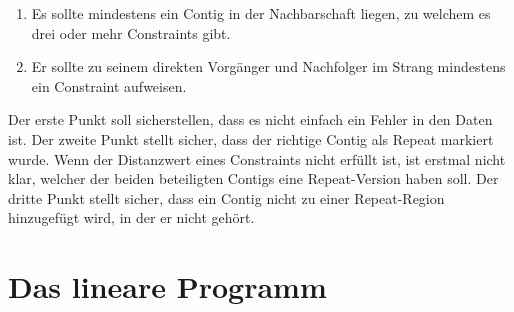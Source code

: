 \begin{enumerate}
	\item Es sollte mindestens ein Contig in der Nachbarschaft liegen, zu welchem es drei oder mehr Constraints gibt.
	\item Er sollte zu seinem direkten Vorgänger und Nachfolger im Strang mindestens ein Constraint aufweisen.
\end{enumerate}
Der erste Punkt soll sicherstellen, dass es nicht einfach ein Fehler in den Daten ist. Der zweite Punkt stellt sicher, dass der richtige Contig als Repeat markiert wurde. Wenn der Distanzwert eines Constraints nicht erfüllt ist, ist erstmal nicht klar, welcher der beiden beteiligten Contigs eine Repeat-Version haben soll. Der dritte Punkt stellt sicher, dass ein Contig nicht zu einer Repeat-Region hinzugefügt wird, in der er nicht gehört.

\chapter{Das lineare Programm}
